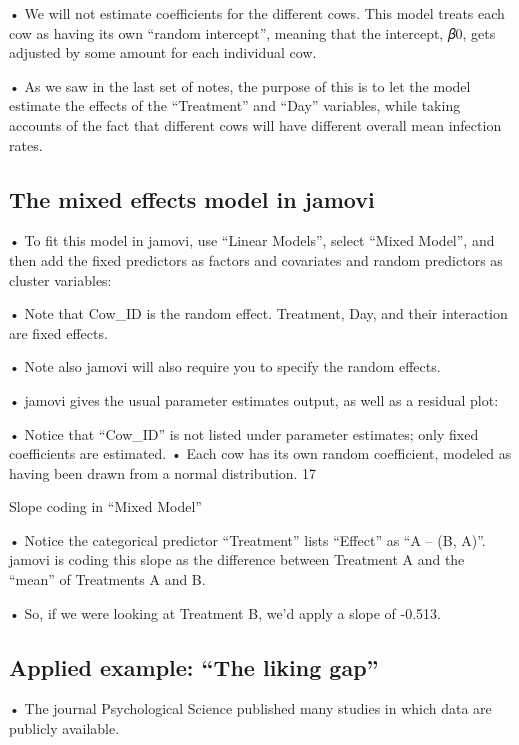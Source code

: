 \documentclass[
  letterpaper,
  DIV=11,
  numbers=noendperiod]{scrreprt}
\begin{document}
• We will not estimate coefficients for the different cows. This model
treats each cow as having its own ``random intercept'', meaning that the
intercept, 𝛽0, gets adjusted by some amount for each individual cow.

• As we saw in the last set of notes, the purpose of this is to let the
model estimate the effects of the ``Treatment'' and ``Day'' variables,
while taking accounts of the fact that different cows will have
different overall mean infection rates.

\hypertarget{the-mixed-effects-model-in-jamovi}{%
\subsection{The mixed effects model in
jamovi}\label{the-mixed-effects-model-in-jamovi}}

• To fit this model in jamovi, use ``Linear Models'', select ``Mixed
Model'', and then add the fixed predictors as factors and covariates and
random predictors as cluster variables:

• Note that Cow\_ID is the random effect. Treatment, Day, and their
interaction are fixed effects.

• Note also jamovi will also require you to specify the random effects.

• jamovi gives the usual parameter estimates output, as well as a
residual plot:

• Notice that ``Cow\_ID'' is not listed under parameter estimates; only
fixed coefficients are estimated. • Each cow has its own random
coefficient, modeled as having been drawn from a normal distribution. 17

Slope coding in ``Mixed Model''

• Notice the categorical predictor ``Treatment'' lists ``Effect'' as ``A
-- (B, A)''. jamovi is coding this slope as the difference between
Treatment A and the ``mean'' of Treatments A and B.

• So, if we were looking at Treatment B, we'd apply a slope of -0.513.

\hypertarget{applied-example-the-liking-gap}{%
\subsection{Applied example: ``The liking
gap''}\label{applied-example-the-liking-gap}}

• The journal Psychological Science published many studies in which data
are publicly available.
\end{document}
